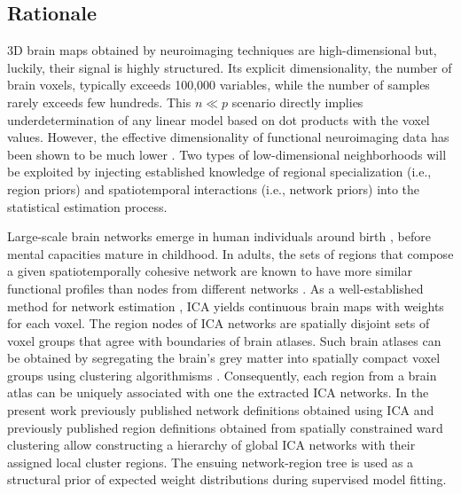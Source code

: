 \documentclass{article}
\begin{document}
\subsection{Rationale}
3D brain maps obtained by neuroimaging
techniques are high-dimensional but, luckily,
their signal is highly structured.
Its explicit dimensionality, the number of brain voxels,
typically exceeds 100,000 variables, while the number
of samples rarely exceeds few hundreds.
This $n \ll p$ scenario directly implies underdetermination of any
linear model based on dot products with the voxel values.
However, the effective dimensionality of functional neuroimaging data has been
shown to be much lower \cite{bzdok2015semi}.
Two types of low-dimensional neighborhoods will be exploited by
injecting established knowledge of regional specialization
(i.e., region priors)
and spatiotemporal interactions
(i.e., network priors)
into the statistical estimation process.



Large-scale brain networks emerge in human individuals around birth
\cite{doria2010}, before mental capacities mature in childhood. 
In adults,
the sets of regions that compose
a given spatiotemporally cohesive network are known to have more
similar functional profiles than nodes from different networks
\cite{anderson2013}.
As a well-established method for network estimation
\cite{beckmann2005},
ICA yields continuous brain maps with
weights for each voxel. The region nodes of ICA
networks are spatially disjoint sets of voxel groups that
agree with boundaries of brain atlases.
Such brain atlases can be obtained by segregating
the brain's grey matter into spatially compact voxel groups
using clustering algorithmisms
\cite{cbp2015review}.
Consequently,
each region from a brain atlas can be uniquely associated with one
the extracted ICA networks.
%
In the present work previously published network definitions
obtained using ICA \cite{smith2009}
and
previously published region definitions obtained from
spatially constrained ward clustering \cite{crad12}
allow constructing a hierarchy of global ICA networks with their
assigned local cluster regions.
The ensuing network-region tree is used as a structural prior
of expected weight distributions
during supervised model fitting.
\end{document}
